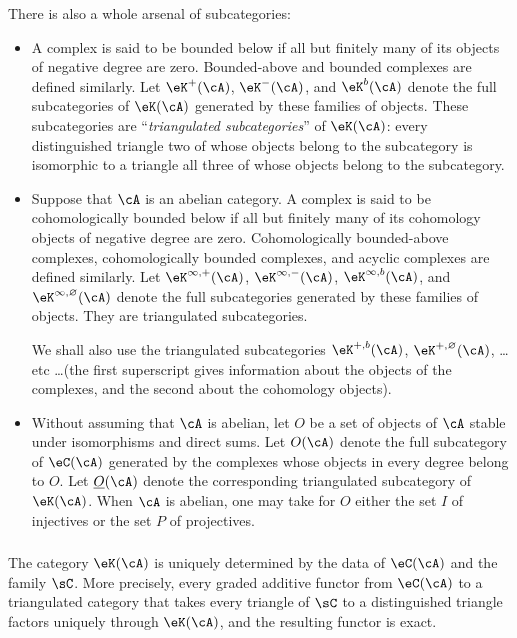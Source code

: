 \documentclass[oneside]{book}
\begin{document}
There is also a whole arsenal of subcategories:
\begin{itemize}
  \item A complex is said to be bounded below if all but finitely many of
    its objects of negative degree are zero. Bounded-above and bounded
    complexes are defined similarly. Let $\eK^+(\cA)$, $\eK^-(\cA)$,
    and $\eK^b(\cA)$ denote the full subcategories of $\eK(\cA)$ generated
    by these families of objects. These subcategories are
    “\emph{triangulated subcategories}” of $\eK(\cA)$: every distinguished
    triangle two of whose objects belong to the subcategory is isomorphic
    to a triangle all three of whose objects belong to the subcategory.
  \item Suppose that $\cA$ is an abelian category. A complex is said to be
    cohomologically bounded below if all but finitely many of its
    cohomology objects of negative degree are zero. Cohomologically
    bounded-above complexes, cohomologically bounded complexes, and
    acyclic complexes are defined similarly. Let
    $\eK^{\infty,+}(\cA)$, $\eK^{\infty,-}(\cA)$,
    $\eK^{\infty,b}(\cA)$, and $\eK^{\infty,\varnothing}(\cA)$ denote the
    full subcategories generated by these families of objects. They are
    triangulated subcategories.

    We shall also use the triangulated subcategories $\eK^{+,b}(\cA)$,
    $\eK^{+,\varnothing}(\cA)$, \ldots etc \ldots (the first superscript
    gives information about the objects of the complexes, and the second
    about the cohomology objects).
  \item Without assuming that $\cA$ is abelian, let $O$ be a set of objects
    of $\cA$ stable under isomorphisms and direct sums. Let $O(\cA)$ denote
    the full subcategory of $\eC(\cA)$ generated by the complexes whose
    objects in every degree belong to $O$. Let $\underline O(\cA)$ denote
    the corresponding triangulated subcategory of $\eK(\cA)$. When $\cA$
    is abelian, one may take for $O$ either the set $I$ of injectives or
    the set $P$ of projectives.
\end{itemize}

\subsubsection{}\label{VIII:1-2-4}

The category $\eK(\cA)$ is uniquely determined by the data of $\eC(\cA)$
and the family $\sC$. More precisely, every graded additive functor from
$\eC(\cA)$ to a triangulated category that takes every triangle of $\sC$
to a distinguished triangle factors uniquely through $\eK(\cA)$, and the
resulting functor is exact.
\end{document}
